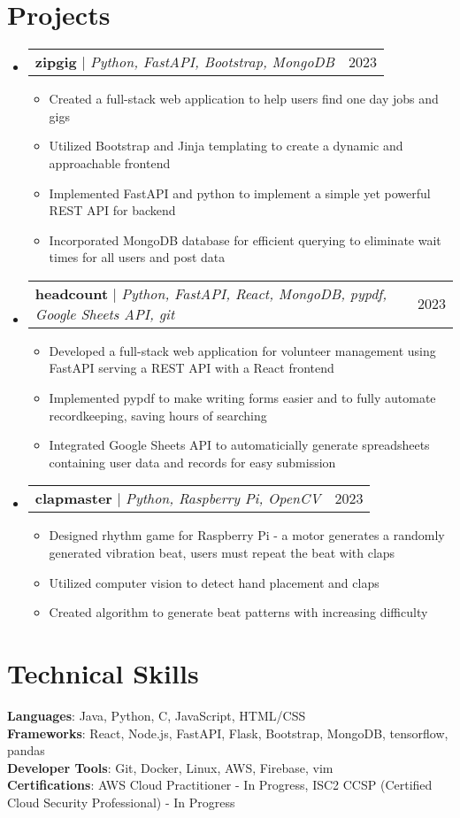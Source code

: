 \documentclass[letterpaper,10pt]{article}
\makeatletter
\newcommand{\resumeItem}[1]{
  \item\small{
    {#1 \vspace{-2pt}}
  }
}
\newcommand{\resumeProjectHeading}[2]{
    \item
    \begin{tabular*}{0.97\textwidth}{l@{\extracolsep{\fill}}r}
      \small#1 & #2 \\
    \end{tabular*}\vspace{-7pt}
}
\newcommand{\resumeSubHeadingListStart}{\begin{itemize}[leftmargin=0.15in, label={}]}
\newcommand{\resumeSubHeadingListEnd}{\end{itemize}}
\newcommand{\resumeItemListStart}{\begin{itemize}}
\newcommand{\resumeItemListEnd}{\end{itemize}\vspace{-5pt}}
\makeatother
\begin{document}
\section{Projects}
    \resumeSubHeadingListStart
      \resumeProjectHeading
          {\textbf{zipgig} $|$ \emph{Python, FastAPI, Bootstrap, MongoDB}}{2023}
          \resumeItemListStart
            \resumeItem{Created a full-stack web application to help users find one day jobs and gigs}
            \resumeItem{Utilized Bootstrap and Jinja templating to create a dynamic and approachable frontend}
            \resumeItem{Implemented FastAPI and python to implement a simple yet powerful REST API for backend} 
            \resumeItem{Incorporated MongoDB database for efficient querying to eliminate wait times for all users and post data}
          \resumeItemListEnd
      \resumeProjectHeading
          {\textbf{headcount} $|$ \emph{Python, FastAPI, React, MongoDB, pypdf, Google Sheets API, git}}{2023}
          \resumeItemListStart
            \resumeItem{Developed a full-stack web application for volunteer management using FastAPI serving a REST API with a React frontend}
            \resumeItem{Implemented pypdf to make writing forms easier and to fully automate recordkeeping, saving hours of searching}
            \resumeItem{Integrated Google Sheets API to automaticially generate spreadsheets containing user data and records for easy submission}
          \resumeItemListEnd
      \resumeProjectHeading
          {\textbf{clapmaster} $|$ \emph{Python, Raspberry Pi, OpenCV}}{2023}
          \resumeItemListStart
            \resumeItem{Designed rhythm game for Raspberry Pi - a motor generates a randomly generated vibration beat, users must repeat the beat with claps}
            \resumeItem{Utilized computer vision to detect hand placement and claps}
            \resumeItem{Created algorithm to generate beat patterns with increasing difficulty} 
          \resumeItemListEnd
    \resumeSubHeadingListEnd



\section{Technical Skills}
 \begin{itemize}[leftmargin=0.15in, label={}]
    \small{\item{
     \textbf{Languages}{: Java, Python, C, JavaScript, HTML/CSS} \\
     \textbf{Frameworks}{: React, Node.js, FastAPI, Flask, Bootstrap, MongoDB, tensorflow, pandas} \\
     \textbf{Developer Tools}{: Git, Docker, Linux, AWS, Firebase, vim} \\
     \textbf{Certifications}{: AWS Cloud Practitioner - In Progress, ISC2 CCSP (Certified Cloud Security Professional) - In Progress}
    }}

 \end{itemize}
\end{document}
